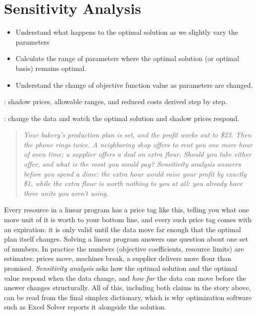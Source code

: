 
\chapter{Sensitivity Analysis}
\label{ch:sensitivity}
\begin{outcome}
\begin{itemize}
\item Understand what happens to the optimal solution as we slightly vary the parameters
\item Calculate the range of parameters where the optimal solution (or optimal basis) remains optimal.
\item Understand the change of objective function value as parameters are changed.
\end{itemize}
\end{outcome}

\begin{tryit}
: shadow prices, allowable ranges, and reduced costs derived step by step.

: change the data and watch the optimal solution and shadow prices respond.
\end{tryit}



\begin{quote}
\itshape Your bakery's production plan is set, and the profit works out to \$23. Then the phone rings twice. A neighboring shop offers to rent you one more hour of oven time; a supplier offers a deal on extra flour. Should you take either offer, and what is the most you would pay? Sensitivity analysis answers before you spend a dime: the extra hour would raise your profit by exactly \$1, while the extra flour is worth nothing to you at all: you already have three units you aren't using.
\end{quote}

Every resource in a linear program has a price tag like this, telling you what one more unit of it is worth to your bottom line, and every such price tag comes with an expiration: it is only valid until the data move far enough that the optimal plan itself changes. Solving a linear program answers one question about one set of numbers. In practice the numbers (objective coefficients, resource limits) are estimates: prices move, machines break, a supplier delivers more flour than promised. \emph{Sensitivity analysis} asks how the optimal solution and the optimal value respond when the data change, and \emph{how far} the data can move before the answer changes structurally. All of this, including both claims in the story above, can be read from the final simplex dictionary, which is why optimization software such as Excel Solver reports it alongside the solution.

